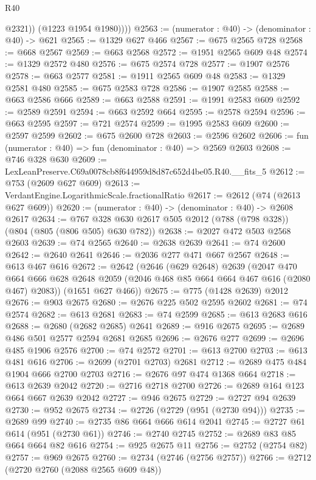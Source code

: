 \begin{lexlean}{R40}
\begin{coremodule}
              @2321))
          (@1223 @1954 @1980))))
@2563 := (numerator : @40) -> (denominator : @40) -> @621
@2565 := @1329 @627 @466
@2567 := @675 @2565 @728
@2568 := @668 @2567
@2569 := @663 @2568
@2572 := @1951 @2565 @609 @48
@2574 := @1329 @2572 @480
@2576 := @675 @2574 @728
@2577 := @1907 @2576
@2578 := @663 @2577
@2581 := @1911 @2565 @609 @48
@2583 := @1329 @2581 @480
@2585 := @675 @2583 @728
@2586 := @1907 @2585
@2588 := @663 @2586 @666
@2589 := @663 @2588
@2591 := @1991 @2583 @609
@2592 := @2589 @2591
@2594 := @663 @2592 @664
@2595 := @2578 @2594
@2596 := @663 @2595
@2597 := @721 @2574
@2599 := @1995 @2583 @609
@2600 := @2597 @2599
@2602 := @675 @2600 @728
@2603 := @2596 @2602
@2606 := fun (numerator : @40) => fun (denominator : @40) => @2569 @2603
@2608 := @746 @328 @630
@2609 := LexLeanPreserve.C69a0078cb8f644959d8d87c652d4be05.R40.__fits_5
@2612 := @753 (@2609 @627 @609)
@2613 := VerdantEngine.LogarithmicScale.fractionalRatio
@2617 := @2612 (@74 (@2613 @627 @609))
@2620 := (numerator : @40) -> (denominator : @40) -> @2608 @2617
@2634 := @767 @328 @630 @2617 @505 @2012 (@788 (@798 @328)) (@804 (@805 (@806 @505) @630 @782))
@2638 := @2027 @472 @503 @2568 @2603
@2639 := @74 @2565
@2640 := @2638 @2639
@2641 := @74 @2600
@2642 := @2640 @2641
@2646 := @2036 @277 @471 @667 @2567
@2648 := @613 @467 @616
@2672 := @2642
    (@2646
      (@629 @2648)
      @2639
      (@2047
        @470
        @664
        @666
        @628
        @2648
        @2059
        (@2046 @468 @85 @664 @664 @467 @616 (@2080 @467) @2083))
      (@1651 @627 @466))
@2675 := @775 (@1428 @2639) @2012
@2676 := @903 @2675
@2680 := @2676 @225 @502 @2595 @2602
@2681 := @74 @2574
@2682 := @613 @2681
@2683 := @74 @2599
@2685 := @613 @2683 @616
@2688 := @2680 (@2682 @2685) @2641
@2689 := @916 @2675
@2695 := @2689 @486 @501 @2577 @2594 @2681 @2685
@2696 := @2676 @277
@2699 := @2696 @485 @1906 @2576
@2700 := @74 @2572
@2701 := @613 @2700
@2703 := @613 @481 @616
@2706 := @2699 (@2701 @2703) @2681
@2712 := @2689 @475 @484 @1904 @666 @2700 @2703
@2716 := @2676 @97 @474 @1368 @664
@2718 := @613 @2639 @2042
@2720 := @2716 @2718 @2700
@2726 := @2689 @164 @123 @664 @667 @2639 @2042
@2727 := @946 @2675
@2729 := @2727 @94 @2639
@2730 := @952 @2675
@2734 := @2726 (@2729 (@951 (@2730 @94)))
@2735 := @2689 @99
@2740 := @2735 @86 @664 @666 @614 @2041
@2745 := @2727 @61 @614 (@951 (@2730 @61))
@2746 := @2740 @2745
@2752 := @2689 @83 @85 @664 @664 @82 @616
@2754 := @925 @2675 @11
@2756 := @2752 (@2754 @82)
@2757 := @969 @2675
@2760 := @2734 (@2746 (@2756 @2757))
@2766 := @2712 (@2720 @2760 (@2088 @2565 @609 @48))

\end{coremodule}
\end{lexlean}
